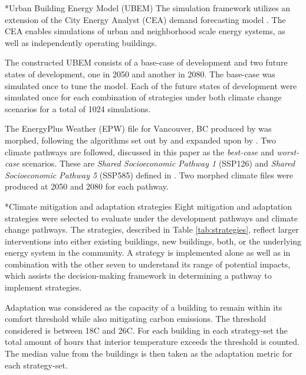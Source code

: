 \documentclass[twocolumn, a4paper,10pt]{article}
\makeatletter
\renewcommand\subsection{\@startsection{subsection}{1}{\z@}{\z@}{\z@}{\normalfont\normalsize\bfseries}}
\renewcommand\subsection{\@startsection{subsection}{1}{\z@}{\z@}{0.1pt}{\normalfont\normalsize\bfseries}}
\makeatother
\begin{document}
\subsection*{Urban Building Energy Model (UBEM)}
The simulation framework utilizes an extension of the City Energy Analyst (CEA) demand forecasting model \citep{fonseca_city_2016,the_cea_team_city_2020}. The CEA enables simulations of urban and neighborhood scale energy systems, as well as independently operating buildings. 

The constructed UBEM consists of a base-case of development and two future states of development, one in 2050 and another in 2080. The base-case was simulated once to tune the model. Each of the future states of development were simulated once for each combination of strategies under both climate change scenarios for a total of 1024 simulations.  

The EnergyPlus Weather (EPW) file for Vancouver, BC produced by \citet{cwec_2016} was morphed, following the algorithms set out by \citet{belcher_constructing_2005} and expanded upon by \citet{jentsch_climate_2008}. Two climate pathways are followed, discussed in this paper as the \textit{best-case} and \textit{worst-case} scenarios. These are \textit{Shared Socioeconomic Pathway 1} (SSP126) and \textit{Shared Socioeconomic Pathway 5} (SSP585)
defined in \citet{oneill_roads_2017}. Two morphed climate files were produced at 2050 and 2080 for each pathway.




\subsection*{Climate mitigation and adaptation strategies}
Eight mitigation and adaptation strategies were selected to evaluate under the development pathways and climate change pathways. The strategies, described in Table \ref{tab:strategies}, reflect larger interventions into either existing buildings, new buildings, both, or the underlying energy system in the community. A strategy is implemented alone as well as in combination with the other seven to understand its range of potential impacts, which assists the decision-making framework in determining a pathway to implement strategies.

Adaptation was considered as the capacity of a building to remain within its comfort threshold while also mitigating carbon emissions. The threshold considered is between 18\textdegree C and 26\textdegree C. For each building in each strategy-set the total amount of hours that interior temperature exceeds the threshold is counted. The median value from the buildings is then taken as the adaptation metric for each strategy-set.
\end{document}
